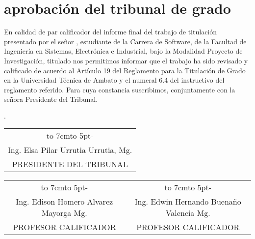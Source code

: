 \chapter*{aprobación del tribunal de grado}
En calidad de par calificador del informe final del trabajo de titulación presentado por el señor \autor, estudiante de la Carrera de Software,
de la Facultad de Ingeniería en Sistemas,
Electrónica e Industrial, bajo la Modalidad Proyecto de Investigación, titulado
	{\MakeUppercase\tema}
nos permitimos informar que el trabajo ha sido revisado
y calificado de acuerdo al Artículo 19 del Reglamento para la Titulación de Grado en
la Universidad Técnica de Ambato y el numeral 6.4 del instructivo del reglamento
referido. Para cuya constancia suscribimos, conjuntamente con la señora Presidente
del Tribunal.
\bigbreak
\begin{flushright}
	\lugarFechaPrelims.
\end{flushright}


\vspace*{4cm}
\begin{center}
	\begin{tabular}{c}
		\hbox to 7cm{\leaders\hbox to 5pt{\hss - \hss}\hfil} \\
		Ing. Elsa Pilar Urrutia Urrutia, Mg.                 \\
		PRESIDENTE DEL TRIBUNAL                              \\
	\end{tabular}
\end{center}
\vspace*{20mm}
\begin{center}
	\begin{tabular}{c c}
		\hbox to 7cm{\leaders\hbox to 5pt{\hss - \hss}\hfil} & \hbox to 7cm{\leaders\hbox to 5pt{\hss - \hss}\hfil} \\
		Ing. Edison Homero Alvarez Mayorga Mg.               & Ing. Edwin Hernando Buenaño Valencia Mg.             \\
		PROFESOR CALIFICADOR                                 & PROFESOR CALIFICADOR
	\end{tabular}
\end{center}
